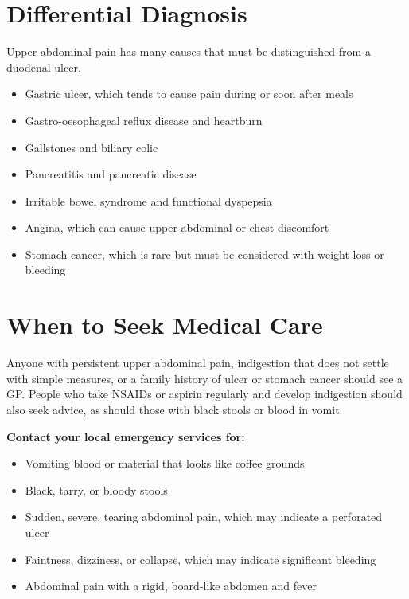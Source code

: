 \section*{Differential Diagnosis}
Upper abdominal pain has many causes that must be distinguished from a duodenal ulcer.
\begin{itemize}
    \item Gastric ulcer, which tends to cause pain during or soon after meals
    \item Gastro-oesophageal reflux disease and heartburn
    \item Gallstones and biliary colic
    \item Pancreatitis and pancreatic disease
    \item Irritable bowel syndrome and functional dyspepsia
    \item Angina, which can cause upper abdominal or chest discomfort
    \item Stomach cancer, which is rare but must be considered with weight loss or bleeding
\end{itemize}

\section*{When to Seek Medical Care}
Anyone with persistent upper abdominal pain, indigestion that does not settle with simple measures, or a family history of ulcer or stomach cancer should see a GP. People who take NSAIDs or aspirin regularly and develop indigestion should also seek advice, as should those with black stools or blood in vomit.

\textbf{Contact your local emergency services for:}
\begin{itemize}
    \item Vomiting blood or material that looks like coffee grounds
    \item Black, tarry, or bloody stools
    \item Sudden, severe, tearing abdominal pain, which may indicate a perforated ulcer
    \item Faintness, dizziness, or collapse, which may indicate significant bleeding
    \item Abdominal pain with a rigid, board-like abdomen and fever
\end{itemize}

